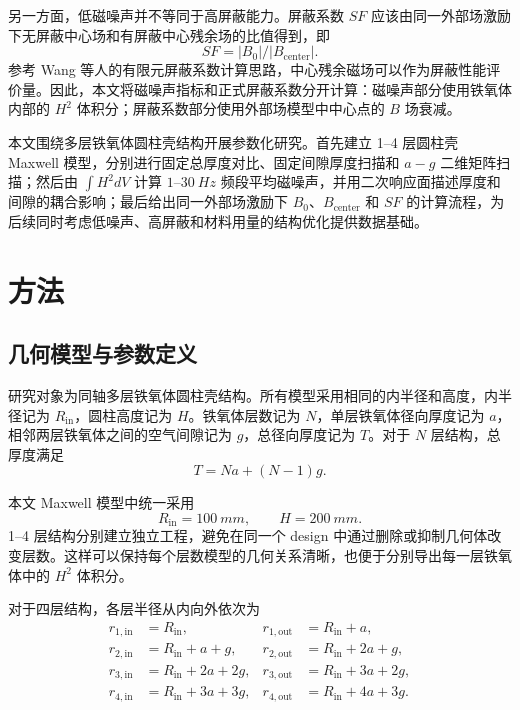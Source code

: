 \documentclass[UTF8,a4paper,12pt]{ctexart}
\begin{document}
另一方面，低磁噪声并不等同于高屏蔽能力。屏蔽系数 \(SF\) 应该由同一外部场激励下无屏蔽中心场和有屏蔽中心残余场的比值得到，即
\[
SF = |B_0|/|B_{\mathrm{center}}|.
\]
参考 Wang 等人的有限元屏蔽系数计算思路，中心残余磁场可以作为屏蔽性能评价量\cite{Wang2024Nanocrystalline}。因此，本文将磁噪声指标和正式屏蔽系数分开计算：磁噪声部分使用铁氧体内部的 \(H^2\) 体积分；屏蔽系数部分使用外部场模型中中心点的 \(B\) 场衰减。

本文围绕多层铁氧体圆柱壳结构开展参数化研究。首先建立 1--4 层圆柱壳 Maxwell 模型，分别进行固定总厚度对比、固定间隙厚度扫描和 \(a-g\) 二维矩阵扫描；然后由
\(\int H^2dV\)
计算 \(1\)--\(\SI{30}{Hz}\) 频段平均磁噪声，并用二次响应面描述厚度和间隙的耦合影响；最后给出同一外部场激励下 \(B_0\)、\(B_{\mathrm{center}}\) 和 \(SF\) 的计算流程，为后续同时考虑低噪声、高屏蔽和材料用量的结构优化提供数据基础。

\section{方法}

\subsection{几何模型与参数定义}

研究对象为同轴多层铁氧体圆柱壳结构。所有模型采用相同的内半径和高度，内半径记为 \(R_{\mathrm{in}}\)，圆柱高度记为 \(H\)。铁氧体层数记为 \(N\)，单层铁氧体径向厚度记为 \(a\)，相邻两层铁氧体之间的空气间隙记为 \(g\)，总径向厚度记为 \(T\)。对于 \(N\) 层结构，总厚度满足
\begin{equation}
    T = Na + (N-1)g .
\end{equation}

本文 Maxwell 模型中统一采用
\[
R_{\mathrm{in}}=\SI{100}{mm}, \qquad H=\SI{200}{mm}.
\]
1--4 层结构分别建立独立工程，避免在同一个 design 中通过删除或抑制几何体改变层数。这样可以保持每个层数模型的几何关系清晰，也便于分别导出每一层铁氧体中的 \(H^2\) 体积分。

对于四层结构，各层半径从内向外依次为
\begin{align}
r_{1,\mathrm{in}} &= R_{\mathrm{in}}, &
r_{1,\mathrm{out}} &= R_{\mathrm{in}} + a, \\
r_{2,\mathrm{in}} &= R_{\mathrm{in}} + a + g, &
r_{2,\mathrm{out}} &= R_{\mathrm{in}} + 2a + g, \\
r_{3,\mathrm{in}} &= R_{\mathrm{in}} + 2a + 2g, &
r_{3,\mathrm{out}} &= R_{\mathrm{in}} + 3a + 2g, \\
r_{4,\mathrm{in}} &= R_{\mathrm{in}} + 3a + 3g, &
r_{4,\mathrm{out}} &= R_{\mathrm{in}} + 4a + 3g .
\end{align}
\end{document}
